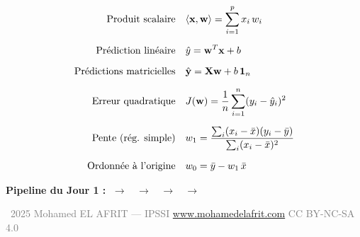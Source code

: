 \begin{tcolorbox}[
    enhanced,
    colback=ipssiBleu!3,
    colframe=ipssiBleu!40,
    boxrule=1pt,
    arc=4pt,
    title={\sffamily\bfseries Formules du Jour 1},
    coltitle=white,
    colbacktitle=ipssiBleu!70,
]
\begin{align}
    \text{Produit scalaire}\quad
        & \langle \mathbf{x}, \mathbf{w} \rangle = \sum_{i=1}^{p} x_i \, w_i
        \label{eq:ps} \\[6pt]
    \text{Pr\'{e}diction lin\'{e}aire}\quad
        & \hat{y} = \mathbf{w}^T \mathbf{x} + b
        \label{eq:pred} \\[6pt]
    \text{Pr\'{e}dictions matricielles}\quad
        & \hat{\mathbf{y}} = \mathbf{X} \mathbf{w} + b\,\mathbf{1}_n
        \label{eq:pred-mat} \\[6pt]
    \text{Erreur quadratique}\quad
        & J(\mathbf{w}) = \frac{1}{n} \sum_{i=1}^{n} (y_i - \hat{y}_i)^2
        \label{eq:mse2} \\[6pt]
    \text{Pente (r\'{e}g. simple)}\quad
        & w_1 = \frac{\sum_{i}(x_i - \bar{x})(y_i - \bar{y})}
                     {\sum_{i}(x_i - \bar{x})^2}
        \label{eq:pente} \\[6pt]
    \text{Ordonn\'{e}e \`{a} l'origine}\quad
        & w_0 = \bar{y} - w_1 \, \bar{x}
        \label{eq:biais}
\end{align}
\end{tcolorbox}

\separateur

\begin{center}
    \small\sffamily
    \textbf{Pipeline du Jour 1 :}\quad
    $\;\longrightarrow\;$
    $\;\longrightarrow\;$
    $\;\longrightarrow\;$
    $\;\longrightarrow\;$
\end{center}

\vfill

\begin{center}
    {\footnotesize\sffamily\textcolor{gray}{%
        \textcopyright\ 2025 Mohamed EL AFRIT --- IPSSI \enspace\textbullet\enspace
        \url{www.mohamedelafrit.com} \enspace\textbullet\enspace
        CC BY-NC-SA 4.0
    }}
\end{center}


